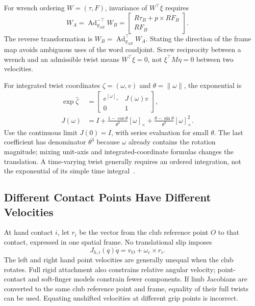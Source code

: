 For wrench ordering $W=(\tau,F)$, invariance of $W^\top\xi$ requires
\begin{equation}
 W_A=\operatorname{Ad}_{g_{AB}}^{-\top}W_B
 =\begin{bmatrix}R\tau_B+p\times RF_B\\RF_B\end{bmatrix}.
\end{equation}
The reverse transformation is $W_B=\operatorname{Ad}_{g_{AB}}^\top W_A$. Stating the direction of the frame map avoids ambiguous uses of the word coadjoint. Screw reciprocity between a wrench and an admissible twist means $W^\top\xi=0$, not $\xi^\top M\eta=0$ between two velocities.

For integrated twist coordinates $\zeta=(\omega,v)$ and $\theta=\|\omega\|$, the exponential is
\begin{align}
 \exp\widehat\zeta&=\begin{bmatrix}e^{[\omega]_\times}&J(\omega)v\\0&1\end{bmatrix},\\
 J(\omega)&=I+\frac{1-\cos\theta}{\theta^2}[\omega]_\times
 +\frac{\theta-\sin\theta}{\theta^3}[\omega]_\times^2.
\end{align}
Use the continuous limit $J(0)=I$, with series evaluation for small $\theta$. The last coefficient has denominator $\theta^3$ because $\omega$ already contains the rotation magnitude; mixing unit-axis and integrated-coordinate formulas changes the translation. A time-varying twist generally requires an ordered integration, not the exponential of its simple time integral~\cite{Murray1994}.

\subsection{Different Contact Points Have Different Velocities}

At hand contact $i$, let $r_i$ be the vector from the club reference point $O$ to that contact, expressed in one spatial frame. No translational slip imposes
\begin{equation}
 J_{h,i}(q)\dot q=v_O+\omega_c\times r_i.
\end{equation}
The left and right hand point velocities are generally unequal when the club rotates. Full rigid attachment also constrains relative angular velocity; point-contact and soft-finger models constrain fewer components. If limb Jacobians are converted to the same club reference point and frame, equality of their full twists can be used. Equating unshifted velocities at different grip points is incorrect.

